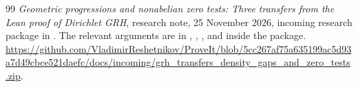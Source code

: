 \begin{thebibliography}{99}
\emph{Geometric progressions and nonabelian zero tests:
Three transfers from the Lean proof of Dirichlet GRH},
research note, 25 November 2026, incoming research package
 in
\cite{incoming}.
The relevant arguments are in ,
, , and
 inside the package.
\url{https://github.com/VladimirReshetnikov/ProveIt/blob/5cc267af75a635199ac5d93a7d49cbce521daefc/docs/incoming/grh_transfers_density_gaps_and_zero_tests.zip}.

\end{thebibliography}
